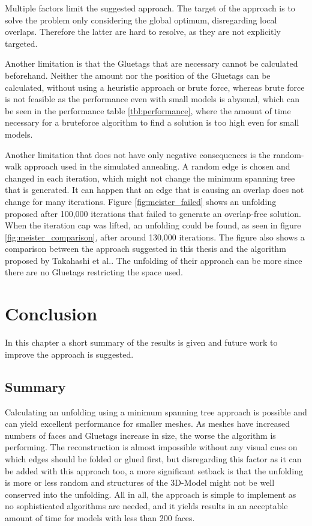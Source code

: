 \documentclass[draft,final]{vutinfth} %
\begin{document}
Multiple factors limit the suggested approach. The target of the approach is to solve the problem only considering the global optimum, disregarding local overlaps. Therefore the latter are hard to resolve, as they are not explicitly targeted.

Another limitation is that the Gluetags that are necessary cannot be calculated beforehand. Neither the amount nor the position of the Gluetags can be calculated, without using a heuristic approach or brute force, whereas brute force is not feasible as the performance even with small models is abysmal, which can be seen in the performance table \ref{tbl:performance}, where the amount of time necessary for a bruteforce algorithm to find a solution is too high even for small models. 

Another limitation that does not have only negative consequences is the random-walk approach used in the simulated annealing. A random edge is chosen and changed in each iteration, which might not change the minimum spanning tree that is generated. It can happen that an edge that is causing an overlap does not change for many iterations. Figure \ref{fig:meister_failed} shows an unfolding proposed after 100,000 iterations that failed to generate an overlap-free solution. When the iteration cap was lifted, an unfolding could be found, as seen in figure \ref{fig:meister_comparison}, after around 130,000 iterations. The figure also shows a comparison between the approach suggested in this thesis and the algorithm proposed by Takahashi et al.\cite{takahashi2011optimized}. The unfolding of their approach can be more since there are no Gluetags restricting the space used.

\chapter{Conclusion}
\label{chap:conclusion}
In this chapter a short summary of the results is given and future work to improve the approach is suggested.

\section{Summary}
Calculating an unfolding using a minimum spanning tree approach is possible and can yield excellent performance for smaller meshes. As meshes have increased numbers of faces and Gluetags increase in size, the worse the algorithm is performing. The reconstruction is almost impossible without any visual cues on which edges should be folded or glued first, but disregarding this factor as it can be added with this approach too, a more significant setback is that the unfolding is more or less random and structures of the 3D-Model might not be well conserved into the unfolding. All in all, the approach is simple to implement as no sophisticated algorithms are needed, and it yields results in an acceptable amount of time for models with less than 200 faces.
\end{document}
